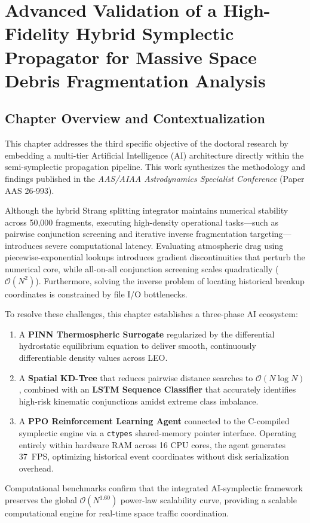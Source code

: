 \chapter{Advanced Validation of a High-Fidelity Hybrid Symplectic Propagator for Massive Space Debris Fragmentation Analysis}
\label{ch:paper3}

\section*{Chapter Overview and Contextualization}
This chapter addresses the third specific objective of the doctoral research by embedding a multi-tier Artificial Intelligence (AI) architecture directly within the semi-symplectic propagation pipeline. This work synthesizes the methodology and findings published in the \textit{AAS/AIAA Astrodynamics Specialist Conference} (Paper AAS 26-993).

Although the hybrid Strang splitting integrator maintains numerical stability across 50,000 fragments, executing high-density operational tasks---such as pairwise conjunction screening and iterative inverse fragmentation targeting---introduces severe computational latency. Evaluating atmospheric drag using piecewise-exponential lookups introduces gradient discontinuities that perturb the numerical core, while all-on-all conjunction screening scales quadratically ($\mathcal{O}(N^2)$). Furthermore, solving the inverse problem of locating historical breakup coordinates is constrained by file I/O bottlenecks.

To resolve these challenges, this chapter establishes a three-phase AI ecosystem:
\begin{enumerate}
    \item A \textbf{PINN Thermospheric Surrogate} regularized by the differential hydrostatic equilibrium equation to deliver smooth, continuously differentiable density values across LEO.
    \item A \textbf{Spatial KD-Tree} that reduces pairwise distance searches to $\mathcal{O}(N \log N)$, combined with an \textbf{LSTM Sequence Classifier} that accurately identifies high-risk kinematic conjunctions amidst extreme class imbalance.
    \item A \textbf{PPO Reinforcement Learning Agent} connected to the C-compiled symplectic engine via a \texttt{ctypes} shared-memory pointer interface. Operating entirely within hardware RAM across 16 CPU cores, the agent generates 37~FPS, optimizing historical event coordinates without disk serialization overhead.
\end{enumerate}
Computational benchmarks confirm that the integrated AI-symplectic framework preserves the global $\mathcal{O}(N^{1.60})$ power-law scalability curve, providing a scalable computational engine for real-time space traffic coordination.

